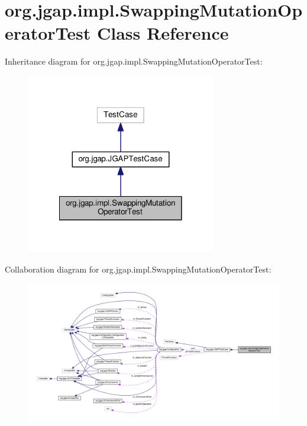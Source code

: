 \hypertarget{classorg_1_1jgap_1_1impl_1_1_swapping_mutation_operator_test}{\section{org.\-jgap.\-impl.\-Swapping\-Mutation\-Operator\-Test Class Reference}
\label{classorg_1_1jgap_1_1impl_1_1_swapping_mutation_operator_test}
}


Inheritance diagram for org.\-jgap.\-impl.\-Swapping\-Mutation\-Operator\-Test\-:
\nopagebreak
\begin{figure}[H]
\begin{center}
\leavevmode
\includegraphics[width=234pt]{classorg_1_1jgap_1_1impl_1_1_swapping_mutation_operator_test__inherit__graph}
\end{center}
\end{figure}


Collaboration diagram for org.\-jgap.\-impl.\-Swapping\-Mutation\-Operator\-Test\-:
\nopagebreak
\begin{figure}[H]
\begin{center}
\leavevmode
\includegraphics[width=350pt]{classorg_1_1jgap_1_1impl_1_1_swapping_mutation_operator_test__coll__graph}
\end{center}
\end{figure}
